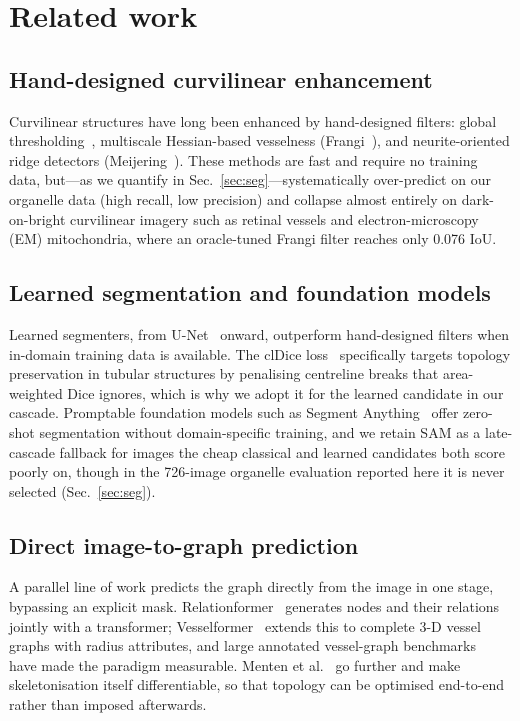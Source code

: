 \documentclass[10pt,a4paper]{article}
\begin{document}
\section{Related work}\label{sec:related}

\subsection{Hand-designed curvilinear enhancement}
Curvilinear structures have long been enhanced by hand-designed filters:
global thresholding~\cite{otsu}, multiscale Hessian-based vesselness
(Frangi~\cite{frangi}), and neurite-oriented ridge detectors
(Meijering~\cite{meijering}). These methods are fast and require no training
data, but---as we quantify in Sec.~\ref{sec:seg}---systematically
over-predict on our organelle data (high recall, low precision) and collapse
almost entirely on dark-on-bright curvilinear imagery such as retinal vessels
and electron-microscopy (EM) mitochondria, where an oracle-tuned Frangi filter
reaches only 0.076 IoU.

\subsection{Learned segmentation and foundation models}
Learned segmenters, from U-Net~\cite{unet} onward, outperform hand-designed
filters when in-domain training data is available. The clDice
loss~\cite{cldice} specifically targets topology preservation in tubular
structures by penalising centreline breaks that area-weighted Dice ignores,
which is why we adopt it for the learned candidate in our cascade. Promptable
foundation models such as Segment Anything~\cite{sam} offer zero-shot
segmentation without domain-specific training, and we retain SAM as a
late-cascade fallback for images the cheap classical and learned candidates
both score poorly on, though in the 726-image organelle evaluation reported
here it is never selected (Sec.~\ref{sec:seg}).

\subsection{Direct image-to-graph prediction}
A parallel line of work predicts the graph directly from the image in one
stage, bypassing an explicit mask. Relationformer~\cite{shit2022relationformer}
generates nodes and their relations jointly with a transformer;
Vesselformer~\cite{prabhakar2023vesselformer} extends this to complete 3-D
vessel graphs with radius attributes, and large annotated vessel-graph
benchmarks~\cite{paetzold2021vesselgraph} have made the paradigm measurable.
Menten et al.~\cite{menten2023skeletonization} go further and make
skeletonisation itself differentiable, so that topology can be optimised
end-to-end rather than imposed afterwards.
\end{document}
